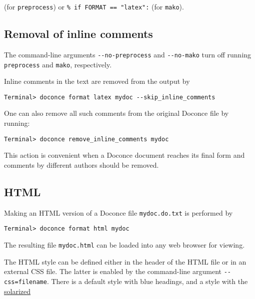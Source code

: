 \documentclass[%
oneside,                 %
final,                   %
10pt]{article}
\begin{document}
(for {\fontsize{10pt}{10pt}\Verb!preprocess!}) or {\fontsize{10pt}{10pt}\Verb!%

\subsection{Removal of inline comments}


The command-line arguments {\fontsize{10pt}{10pt}\Verb!--no-preprocess!} and {\fontsize{10pt}{10pt}\Verb!--no-mako!} turn off
running {\fontsize{10pt}{10pt}\Verb!preprocess!} and {\fontsize{10pt}{10pt}\Verb!mako!}, respectively.

Inline comments in the text are removed from the output by
\vspace{4pt}
\begin{Verbatim}[numbers=none,frame=lines,label=\fbox{{\tiny Terminal}},fontsize=\fontsize{9pt}{9pt},
labelposition=topline,framesep=2.5mm,framerule=0.7pt]
Terminal> doconce format latex mydoc --skip_inline_comments
\end{Verbatim}
One can also remove all such comments from the original Doconce
file by running:
\begin{Verbatim}[fontsize=\fontsize{9pt}{9pt},tabsize=8,baselinestretch=0.85,
fontfamily=tt,xleftmargin=7mm]
Terminal> doconce remove_inline_comments mydoc
\end{Verbatim}
\noindent
This action is convenient when a Doconce document reaches its final form
and comments by different authors should be removed.

\subsection{HTML}

Making an HTML version of a Doconce file {\fontsize{10pt}{10pt}\Verb!mydoc.do.txt!}
is performed by
\vspace{4pt}
\begin{Verbatim}[numbers=none,frame=lines,label=\fbox{{\tiny Terminal}},fontsize=\fontsize{9pt}{9pt},
labelposition=topline,framesep=2.5mm,framerule=0.7pt]
Terminal> doconce format html mydoc
\end{Verbatim}
The resulting file {\fontsize{10pt}{10pt}\Verb!mydoc.html!} can be loaded into any web browser for viewing.

The HTML style can be defined either in the header of the HTML file or
in an external CSS file. The latter is enabled by the command-line
argument {\fontsize{10pt}{10pt}\Verb!--css=filename!}. There is a default style with blue headings,
and a style with the \href{{http://ethanschoonover.com/solarized}}{solarized}
\end{document}
